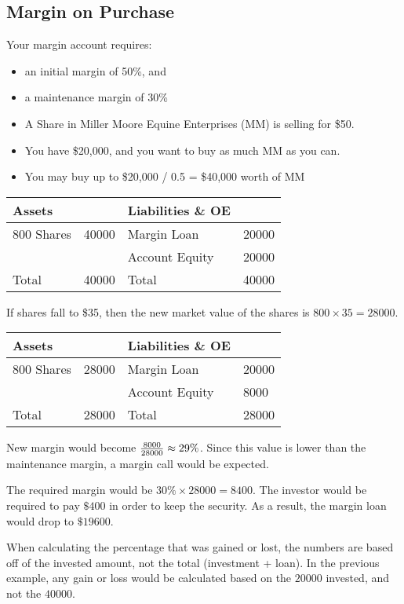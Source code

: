 \documentclass[english, 12pt]{article}
\begin{document}
\subsection{Margin on Purchase}
\begin{exmp}
Your margin account requires:
\begin{itemize}
  \item an initial margin of 50\%, and
  \item a maintenance margin of 30\%
  \item A Share in Miller Moore Equine Enterprises (MM) is selling for \$50.
  \item You have \$20,000, and you want to buy as much MM as you can.
  \item You may buy up to \$20,000 / 0.5 = \$40,000 worth of MM
\end{itemize}
\begin{center}
\begin{tabular}{|ll|ll|}
\hline
Assets & & Liabilities \& OE & \\
\hline
800 Shares & 40000 & Margin Loan & 20000 \\
& & Account Equity & 20000 \\
\hline
Total & 40000 & Total & 40000\\
\hline
\end{tabular}
\end{center}
If shares fall to \$35, then the new market value of the shares is $800 \times 35 = 28000$.
\begin{center}
\begin{tabular}{|ll|ll|}
\hline
Assets & & Liabilities \& OE & \\
\hline
800 Shares & {\color{red}28000} & Margin Loan & 20000 \\
& & Account Equity & {\color{red} 8000} \\
\hline
Total & {\color{red} 28000} & Total & {\color{red} 28000}\\
\hline
\end{tabular}
\end{center}
New margin would become $\frac{8000}{28000} \approx 29\%$. Since this value is lower than the maintenance margin, a margin call would be expected.
\begin{note}
The required margin would be $30\% \times 28000 = 8400$. The investor would be required to pay $\$400$ in order to keep the security. As a result, the margin loan would drop to $\$19600$.
\end{note}
\end{exmp}
\begin{qte}
When calculating the percentage that was gained or lost, the numbers are based off of the invested amount, not the total (investment + loan). In the previous example, any gain or loss would be calculated based on the $20000$ invested, and not the $40000$.
\end{qte}
\end{document}
